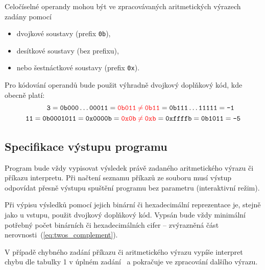 Celočíselné operandy mohou být ve zpracovávaných aritmetických výrazech zadány pomocí
\begin{itemize}
    \item dvojkové soustavy (prefix \verb|0b|),
    \item desítkové soustavy (bez prefixu),
    \item nebo šestnáctkové soustavy (prefix \verb|0x|). 
\end{itemize}
Pro kódování operandů bude použit výhradně dvojkový doplňkový kód, kde obecně platí:
\begin{equation}\label{eq:twos_complement}
\begin{aligned}
    \verb|3|=\verb|0b000|\dots\verb|00011|=\mathbin{\color{red}{\verb|0b011|}}&\mathbin{\color{red}{\neq}}\mathbin{\color{red}{\verb|0b11|}}=\verb|0b111|\dots\verb|11111|=\verb|-1| \\
    \verb|11|=\verb|0b0001011|=\verb|0x0000b|=\mathbin{\color{red}{\verb|0x0b|}}&\mathbin{\color{red}{\neq}}\mathbin{\color{red}{\verb|0xb|}}=\verb|0xffffb|=\verb|0b1011|=\verb|-5|
\end{aligned}
\end{equation}

\subsection{Specifikace výstupu programu}\label{subsection:output}
Program bude vždy vypisovat výsledek právě zadaného aritmetického výrazu či příkazu interpretu. Při načtení seznamu příkazů ze souboru musí výstup odpovídat přesně výstupu spuštění programu bez parametru (interaktivní režim).

Při výpisu výsledků pomocí jejich binární či hexadecimální reprezentace je, stejně jako u vstupu, použit dvojkový doplňkový kód. Vypsán bude vždy minimální potřebný počet binárních či hexadecimálních cifer – zvýrazněná část nerovnosti~(\ref{eq:twos_complement}). 

V případě chybného zadání příkazu či aritmetického výrazu vypíše interpret chybu dle tabulky
1 v úplném zadání~\cite{bib:zadani} a pokračuje ve zpracování dalšího výrazu. 